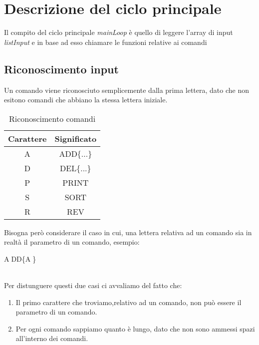 \section{Descrizione del ciclo principale}

Il compito del ciclo principale \textit{mainLoop} è quello di leggere 
l'array di input \textit{listInput} e in base ad esso chiamare le funzioni relative ai comandi

\subsection{Riconoscimento input}
Un comando viene riconosciuto semplicemente dalla prima lettera, dato che non esitono comandi che abbiano la stessa lettera iniziale.
\\
\begin{table}[H]
\begin{center}
\begin{tabular}{|c|c|}
    \hline
    Carattere & Significato \\
    \hline
    A & ADD\{...\} \\
    \hline
    D & DEL\{...\} \\
    \hline
    P & PRINT \\
    \hline
    S & SORT \\
    \hline
    R & REV \\
    \hline
\end{tabular}
\caption{Riconoscimento comandi}
\label{tab:commandIdentification}
\end{center}
\end{table}

Bisogna però considerare il caso in cui, 
una lettera relativa ad un comando sia in realtà il parametro di un comando, esempio:\\
\centerline{\textcircled{A}DD\{\textcircled{A}\}} \\


Per distunguere questi due casi ci avvaliamo del fatto che:
\begin{enumerate}
    \item Il primo carattere che troviamo,relativo ad un comando, non può essere il parametro di un comando.
    \item Per ogni comando sappiamo quanto è lungo, dato che non sono ammessi spazi all'interno dei comandi.
\end{enumerate}

